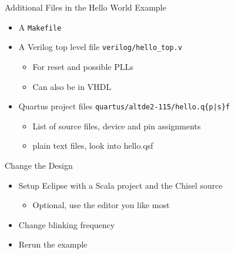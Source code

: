 \documentclass[xcolor=pdflatex,dvipsnames,table]{beamer}
\newcommand{\code}[1]{{\texttt{#1}}}
\begin{document}
\begin{frame}[fragile]{Additional Files in the Hello World Example}
\begin{itemize}
\item A \code{Makefile}
\item A Verilog top level file \code{verilog/hello\_top.v}
\begin{itemize}
\item For reset and possible PLLs
\item Can also be in VHDL
\end{itemize}
\item Quartus project files \code{quartus/altde2-115/hello.q\{p|s\}f}
\begin{itemize}
\item List of source files, device and pin assignments
\item plain text files, look into hello.qsf
\end{itemize}
\end{itemize}
\end{frame}

\begin{frame}[fragile]{Change the Design}
\begin{itemize}
\item Setup Eclipse with a Scala project and the Chisel source
\begin{itemize}
\item Optional, use the editor you like most
\end{itemize}
\item Change blinking frequency
\item Rerun the example
\end{itemize}
\end{frame}
\end{document}
